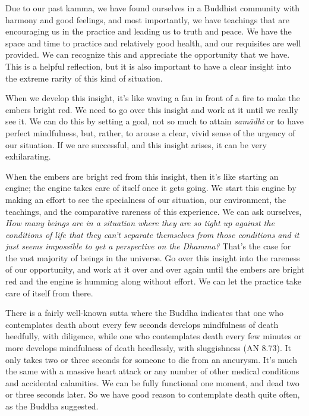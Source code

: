 
Due to our past kamma, we have found ourselves in a Buddhist community 
with harmony and good feelings, and most importantly, we have teachings 
that are encouraging us in the practice and leading us to truth and 
peace. We have the space and time to practice and relatively good 
health, and our requisites are well provided. We can recognize this and 
appreciate the opportunity that we have. This is a helpful reflection, 
but it is also important to have a clear insight into the extreme 
rarity of this kind of situation.

When we develop this insight, it's like waving a fan in front of a fire 
to make the embers bright red. We need to go over this insight and work 
at it until we really see it. We can do this by setting a goal, not so 
much to attain \emph{samādhi} or to have perfect mindfulness, but, 
rather, to arouse a clear, vivid sense of the urgency of our situation. 
If we are successful, and this insight arises, it can be very 
exhilarating.

When the embers are bright red from this insight, then it's like 
starting an engine; the engine takes care of itself once it gets going. 
We start this engine by making an effort to see the specialness of our 
situation, our environment, the teachings, and the comparative rareness 
of this experience. We can ask ourselves, \emph{How many beings are in 
a situation where they are so tight up against the conditions of life 
that they can't separate themselves from those conditions and it just 
seems impossible to get a perspective on the Dhamma?} That's the case 
for the vast majority of beings in the universe. Go over this insight 
into the rareness of our opportunity, and work at it over and over 
again until the embers are bright red and the engine is humming along 
without effort. We can let the practice take care of itself from there.


There is a fairly well-known sutta where the Buddha indicates that one 
who contemplates death about every few seconds develops mindfulness of 
death heedfully, with diligence, while one who contemplates death every 
few minutes or more develops mindfulness of death heedlessly, with 
sluggishness (AN 8.73). It only takes two or three seconds for someone 
to die from an aneurysm. It's much the same with a massive heart attack 
or any number of other medical conditions and accidental calamities. We 
can be fully functional one moment, and dead two or three seconds 
later. So we have good reason to contemplate death quite often, as the 
Buddha suggested.

